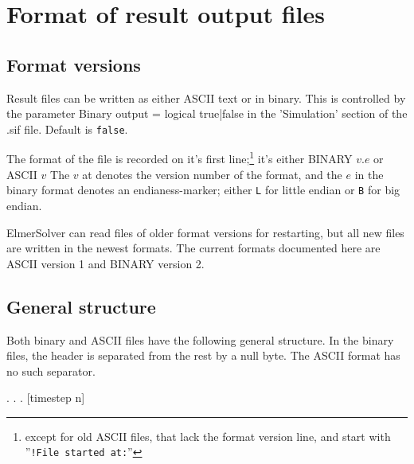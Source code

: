 \newcommand{\Str}[1]{<{#1}{\small\tt (str)}>}
\newcommand{\Int}[2]{<{#2}{\small\tt (i#1)}>}
\newcommand{\Dbl}[1]{<{#1}{\small\tt (dbl)}>}
\newcommand{\Perm}{\ensuremath{p}}
\newcommand{\nTime}{\ensuremath{\mathit{nt}}}
\newcommand{\nSaved}{\ensuremath{\mathit{ns}}}
\newcommand{\Time}{\ensuremath{t}}
\newcommand{\nPositive}{\ensuremath{\mathit{np}}}
\newcommand{\PermSize}{\ensuremath{\mathit{size}}}
\newcommand{\Pos}{\ensuremath{\mathit{Pos}}}
\newcommand{\nNodes}{\ensuremath{\mathit{nNodes}}}
\newcommand{\Var}{\ensuremath{\mathit{Var}}}

\chapter{Format of result output files}

\section{Format versions}

Result files can be written as either ASCII text or in binary. This is
controlled by the parameter
\ttbegin
        Binary output = logical true|false
\ttend
in the 'Simulation' section of the .sif file.  Default is \texttt{false}.

The format of the file is recorded on it's first line;\footnote{except for
old ASCII files, that lack the format version line, and start with
''\texttt{!File started at:}''} it's either
\ttbegin
 BINARY \(v.e\)
\ttend
or
\ttbegin
 ASCII \(v\)
\ttend
The $v$ at denotes the version number of the format, and the $e$ in the
binary format denotes an endianess-marker; either \verb+L+ for little
endian or \verb+B+ for big endian.

ElmerSolver can read files of older format versions for restarting, but all
new files are written in the newest formats. The current formats documented
here are ASCII version 1 and BINARY version 2.

\section{General structure}
Both binary and ASCII files have the following general structure. In the
binary files, the header is separated from the rest by a null byte.  The
ASCII format has no such separator.

   .
   .
   .
[timestep n]
\ttend

